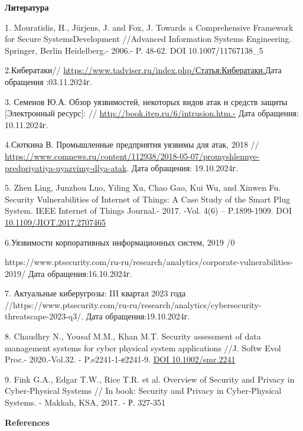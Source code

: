 \begin{center}
{\bfseries Литература}
\end{center}

\begin{references}
1. Mouratidis, H., Jürjens, J. and Fox, J. Towards a Comprehensive
Framework for Secure SystemsDevelopment //Advanced Information Systems
Engineering. Springer, Berlin Heidelberg.- 2006.- P. 48-62. DOI
10.1007/11767138\_5

2.Кибератаки//
\href{\%20https://www.tadviser.ru/index.php/Статья:Кибератаки.}{https://www.tadviser.ru/index.php/Статья:Кибератаки.}Дата
обращения :03.11.2024г.

3. Семенов Ю.А. Обзор уязвимостей, некоторых видов атак и средств защиты
{[}Электронный ресурс{]}: // \url{http://book.itep.ru/6/intrusion.htm.-}
Дата обращения: 10.11.2024г.

4.Сюткина В. Промышленные предприятия уязвимы для атак, 2018 //
\url{https://www.comnews.ru/content/112938/2018-05-07/promyshlennye-predpriyatiya-uyazvimy-dlya-atak}.
Дата обращения: 19.10.2024г.

5. Zhen Ling, Junzhou Luo, Yiling Xu, Chao Gao, Kui Wu, and Xinwen Fu.
Security Vulnerabilities of Internet of Things: A Case Study of the
Smart Plug System. IEEE Internet of Things Journal.- 2017. -Vol. 4(6) --
P.1899-1909. DOI
\href{https://doi.org/10.1109/JIOT.2017.2707465}{10.1109/JIOT.2017.2707465}

6.Уязвимости корпоративных информационных систем, 2019 /0

https://www.ptsecurity.com/ru-ru/research/analytics/corporate-vulnerabilities-2019/
Дата обращения:16.10.2024г.

7. Актуальные киберугрозы: III квартал 2023 года
//https://www.ptsecurity.com/ru-ru/research/analytics/cybersecurity-threatscape-2023-q3/.
Дата обращения:19.10.2024г.

8. Chaudhry N., Yousaf M.M., Khan M.T. Security assessment of data
management systems for cyber physical system applications //J. Softw
Evol Proc.- 2020.-Vol.32. - P.e2241-1-е2241-9.
\href{https://doi.org/10.1002/smr.2241}{DOI 10.1002/smr.2241}

9. Fink G.A., Edgar T.W., Rice T.R. et al. Overview of Security and
Privacy in Cyber‐Physical Systems // In book: Security and Privacy in
Cyber‐Physical Systems. - Makkah, KSA, 2017. - Р. 327-351
\end{references}

\begin{center}
{\bfseries References}
\end{center}

